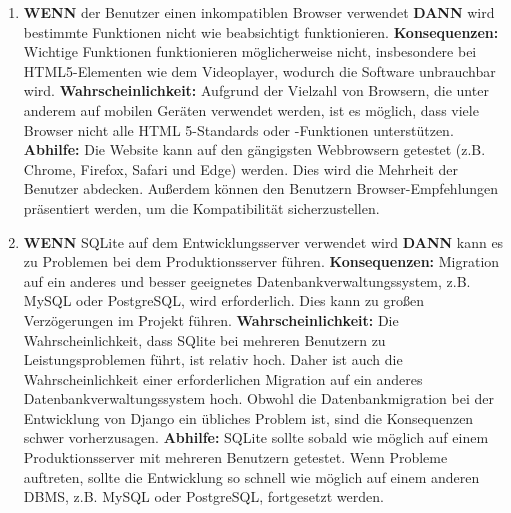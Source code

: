 \begin{enumerate}
    \item
    \textbf{WENN} der Benutzer einen inkompatiblen Browser verwendet \textbf{DANN} wird  bestimmte Funktionen nicht wie beabsichtigt funktionieren.
    \linebreak
    \linebreak
    \textbf{Konsequenzen:} Wichtige Funktionen funktionieren möglicherweise nicht, insbesondere bei HTML5-Elementen wie dem Videoplayer, wodurch die Software unbrauchbar wird.
    \linebreak
    \linebreak
    \textbf{Wahrscheinlichkeit:} Aufgrund der Vielzahl von Browsern, die unter anderem auf mobilen Geräten verwendet werden, ist es möglich, dass viele Browser nicht alle HTML 5-Standards oder -Funktionen unterstützen.
    \linebreak
    \linebreak
    \textbf{Abhilfe:} Die Website kann auf den gängigsten Webbrowsern getestet (z.B. Chrome, Firefox, Safari und Edge) werden. Dies wird die Mehrheit der Benutzer abdecken. Außerdem können den Benutzern Browser-Empfehlungen präsentiert werden, um die Kompatibilität sicherzustellen.
    \linebreak
    
    \item
    \textbf{WENN} SQLite auf dem Entwicklungsserver verwendet wird \textbf{DANN} kann es zu Problemen bei dem Produktionsserver führen.
    \linebreak
    \linebreak
    \textbf{Konsequenzen:} Migration auf ein anderes und besser geeignetes Datenbankverwaltungssystem, z.B.  MySQL oder PostgreSQL,  wird erforderlich.  Dies kann zu großen Verzögerungen im Projekt führen.
    \linebreak
    \linebreak
    \textbf{Wahrscheinlichkeit:} Die Wahrscheinlichkeit, dass SQlite bei mehreren Benutzern zu Leistungsproblemen führt, ist relativ hoch. Daher ist auch die Wahrscheinlichkeit einer erforderlichen Migration auf ein anderes Datenbankverwaltungssystem hoch. Obwohl die Datenbankmigration bei der Entwicklung von Django ein übliches Problem ist, sind die Konsequenzen schwer vorherzusagen.
    \linebreak
    \linebreak
    \textbf{Abhilfe:} SQLite sollte sobald wie möglich auf einem Produktionsserver mit mehreren Benutzern getestet. Wenn Probleme auftreten, sollte die Entwicklung so schnell wie möglich auf einem anderen DBMS, z.B.  MySQL oder PostgreSQL, fortgesetzt werden.
    \linebreak


\end{enumerate}


